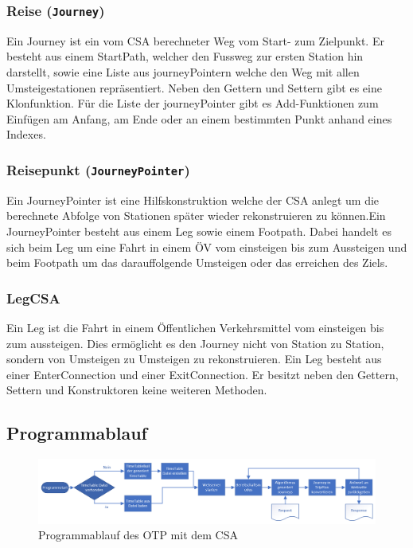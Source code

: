 \subsubsection{Reise (\texttt{Journey})}
Ein Journey ist ein vom CSA berechneter Weg vom Start- zum Zielpunkt. Er besteht aus einem StartPath, welcher den Fussweg zur ersten Station hin darstellt, sowie eine Liste aus journeyPointern welche den Weg mit allen Umsteigestationen repräsentiert. Neben den Gettern und Settern gibt es eine Klonfunktion. Für die Liste der journeyPointer gibt es Add-Funktionen zum Einfügen am Anfang, am Ende oder an einem bestimmten Punkt anhand eines Indexes.

\subsubsection{Reisepunkt (\texttt{JourneyPointer})}
Ein JourneyPointer ist eine Hilfskonstruktion welche der CSA anlegt um die berechnete Abfolge von Stationen später wieder rekonstruieren zu können.Ein JourneyPointer besteht aus einem Leg sowie einem Footpath. Dabei handelt es sich beim Leg um eine Fahrt in einem ÖV vom einsteigen bis zum Aussteigen und beim Footpath um das darauffolgende Umsteigen oder das erreichen des Ziels.

\subsubsection{LegCSA}
Ein Leg ist die Fahrt in einem Öffentlichen Verkehrsmittel vom einsteigen bis zum aussteigen. Dies ermöglicht es den Journey nicht von Station zu Station, sondern von Umsteigen zu Umsteigen zu rekonstruieren. Ein Leg besteht aus einer EnterConnection und einer ExitConnection. Er besitzt neben den Gettern, Settern und Konstruktoren keine weiteren Methoden.

\subsection{Programmablauf}
\begin{figure}[htb]
	\centering
	\includegraphics[width=15cm]{img/programmablauf.png}
	\caption{Programmablauf des OTP mit dem CSA}
	\label{fig:programmablauf}
\end{figure}

